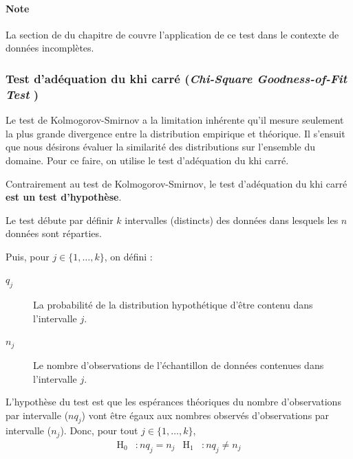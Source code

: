 \documentclass[french]{article}
\begin{document}
\begin{multicols*}{2}
\bigskip

\paragraph{Note}	La section de \textit{\underline{}} du chapitre de \textit{\underline{}} couvre l'application de ce test dans le contexte de données incomplètes.



\columnbreak
\subsubsection{Test d'adéquation du khi carré (\og \textit{Chi-Square Goodness-of-Fit Test} \fg{})}
\begin{rappel_enhanced}[Motivation]
Le test de Kolmogorov-Smirnov a la limitation inhérente qu'il mesure seulement la plus grande divergence entre la distribution empirique et théorique. Il s'ensuit que nous désirons évaluer la similarité des distributions sur l'ensemble du domaine. Pour ce faire, on utilise le test d'adéquation du khi carré.

\bigskip

Contrairement au test de Kolmogorov-Smirnov, le test d'adéquation du khi carré \textbf{est un test d'hypothèse}.
\end{rappel_enhanced}


\begin{definitionNOHFILL}
Le test débute par définir $k$ intervalles (distincts) des données dans lesquels les $n$ données sont réparties. 

\bigskip

Puis, pour $j \in \{1, \dots, k\}$, on défini : 
\begin{description}
	\item[$q_{j}$]	La probabilité de la distribution hypothétique d'être contenu dans l'intervalle $j$.
	\item[$n_{j}$]	Le nombre d'observations de l'échantillon de données contenues dans l'intervalle $j$.
\end{description}

\bigskip

L'hypothèse du test est que les espérances théoriques du nombre d'observations par intervalle ($nq_{j}$) vont être égaux aux nombres observés d'observations par intervalle ($n_{j}$). Donc, pour tout $j \in \{1, \dots, k\}$,
\begin{align*}
	\textrm{H}_{0}	&:	nq_{j}	=	n_{j}	&
	\textrm{H}_{1}	&:	nq_{j}	\neq	n_{j}
\end{align*}


\end{definitionNOHFILL}
\end{multicols*}
\end{document}
